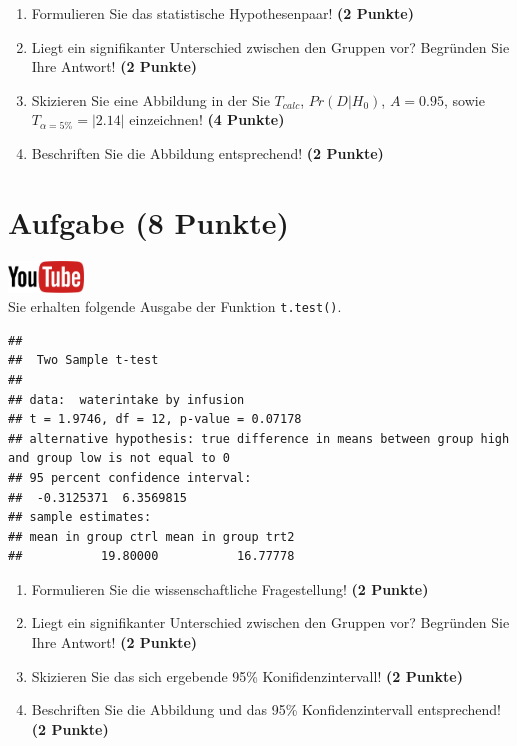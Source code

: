 \documentclass[a4paper, 10pt]{scrartcl}\usepackage[]{graphicx}\usepackage[]{xcolor}
\makeatletter
\newenvironment{kframe}{%
 \def\at@end@of@kframe{}%
 \ifinner\ifhmode%
  \def\at@end@of@kframe{\end{minipage}}%
  \begin{minipage}{\columnwidth}%
 \fi\fi%
 \def\FrameCommand##1{\hskip\@totalleftmargin \hskip-\fboxsep
 \colorbox{shadecolor}{##1}\hskip-\fboxsep
     \hskip-\linewidth \hskip-\@totalleftmargin \hskip\columnwidth}%
 \MakeFramed {\advance\hsize-\width
   \@totalleftmargin\z@ \linewidth\hsize
   \@setminipage}}%
 {\par\unskip\endMakeFramed%
 \at@end@of@kframe}
\newenvironment{knitrout}{}{} %
\makeatother
\begin{document}
\begin{enumerate}
  \item Formulieren Sie das statistische Hypothesenpaar! \textbf{(2
Punkte)}
\item Liegt ein signifikanter Unterschied zwischen den Gruppen vor?
  Begr{\"u}nden Sie Ihre Antwort! \textbf{(2 Punkte)}
\item Skizieren Sie eine Abbildung in der Sie $T_{calc}$, $Pr(D|H_0)$, $A=0.95$,
  sowie $T_{\alpha=5\%} = |2.14|$ einzeichnen! \textbf{(4 Punkte)}
\item Beschriften Sie die Abbildung entsprechend! \textbf{(2 Punkte)}  
\end{enumerate} 
\clearpage

\section{Aufgabe \hfill (8 Punkte)}

\hfill\href{https://youtu.be/wJqsNV1hOW8}{\includegraphics[width =
  2cm]{img/youtube}}\\[1Ex]

Sie erhalten folgende \Rlogo Ausgabe der Funktion \texttt{t.test()}.

\begin{knitrout}
\color{fgcolor}\begin{kframe}
\begin{verbatim}
## 
## 	Two Sample t-test
## 
## data:  waterintake by infusion
## t = 1.9746, df = 12, p-value = 0.07178
## alternative hypothesis: true difference in means between group high and group low is not equal to 0
## 95 percent confidence interval:
##  -0.3125371  6.3569815
## sample estimates:
## mean in group ctrl mean in group trt2 
##           19.80000           16.77778
\end{verbatim}
\end{kframe}
\end{knitrout}


\begin{enumerate}
  \item Formulieren Sie die wissenschaftliche Fragestellung! \textbf{(2
Punkte)}
\item Liegt ein signifikanter Unterschied zwischen den Gruppen vor?
  Begr{\"u}nden Sie Ihre Antwort! \textbf{(2 Punkte)}
\item Skizieren Sie das sich ergebende 95\% Konifidenzintervall! \textbf{(2 Punkte)}
\item Beschriften Sie die Abbildung und
  das 95\% Konfidenzintervall entsprechend! \textbf{(2 Punkte)}  
\end{enumerate} 
\clearpage
\end{document}
